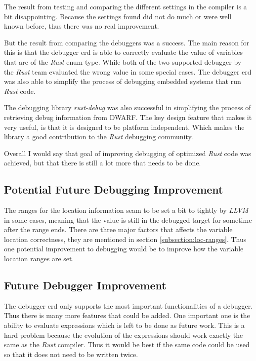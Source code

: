 
The result from testing and comparing the different settings in the compiler is a bit disappointing.
Because the settings found did not do much or were well known before, thus there was no real improvement.


But the result from comparing the debuggers was a success.
The main reason for this is that the debugger \gls{erd} is able to correctly evaluate the value of variables that are of the \emph{Rust} enum type.
While both of the two supported debugger by the \emph{Rust} team evaluated the wrong value in some special cases.
The debugger \gls{erd} was also able to simplify the process of debugging embedded systems that run \emph{Rust} code.


The debugging library \emph{rust-debug} was also successful in simplifying the process of retrieving debug information from \gls{DWARF}.
The key design feature that makes it very useful, is that it is designed to be platform independent.
Which makes the library a good contribution to the \emph{Rust} debugging community.


Overall I would say that goal of improving debugging of optimized \emph{Rust} code was achieved, but that there is still a lot more that needs to be done.


\subsection{Potential Future Debugging Improvement}
The ranges for the location information seam to be set a bit to tightly by \emph{LLVM} in some cases, meaning that the value is still in the debugged target for sometime after the range ends.
There are three major factors that affects the variable location correctness, they are mentioned in section \ref{subsection:loc-ranges}.
Thus one potential improvement to debugging would be to improve how the variable location ranges are set.


\subsection{Future Debugger Improvement}
The debugger \gls{erd} only supports the most important functionalities of a debugger.
Thus there is many more features that could be added.
One important one is the ability to evaluate expressions which is left to be done as future work.
This is a hard problem because the evolution of the expressions should work exactly the same as the \emph{Rust} compiler.
Thus it would be best if the same code could be used so that it does not need to be written twice.


